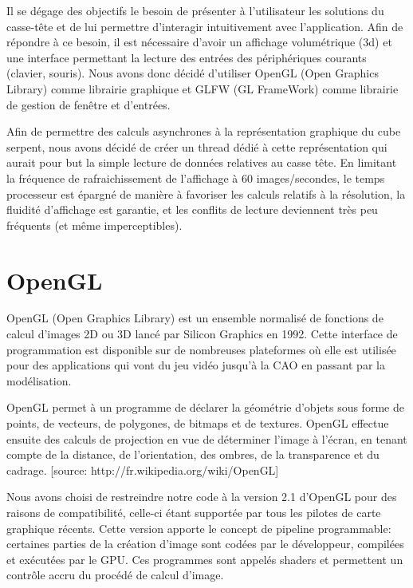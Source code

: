 Il se dégage des objectifs le besoin de présenter à l'utilisateur les solutions du casse-tête et de lui permettre d'interagir intuitivement avec l'application. Afin de répondre à ce besoin, il est nécessaire d'avoir un affichage volumétrique (3d) et une interface permettant la lecture des entrées des périphériques courants (clavier, souris). Nous avons donc décidé d'utiliser OpenGL (Open Graphics Library) comme librairie graphique et GLFW (GL FrameWork) comme librairie de gestion de fenêtre et d'entrées.

Afin de permettre des calculs asynchrones à la représentation graphique du cube serpent, nous avons décidé de créer un thread dédié à cette représentation qui aurait pour but la simple lecture de données relatives au casse tête. En limitant la fréquence de rafraichissement de l'affichage à 60 images/secondes, le temps processeur est épargné de manière à favoriser les calculs relatifs à la résolution,  la fluidité d'affichage est garantie, et les conflits de lecture deviennent très peu fréquents (et même imperceptibles).

\section{OpenGL}

OpenGL (Open Graphics Library) est un ensemble normalisé de fonctions de calcul d'images 2D ou 3D lancé par Silicon Graphics en 1992. Cette interface de programmation est disponible sur de nombreuses plateformes où elle est utilisée pour des applications qui vont du jeu vidéo jusqu'à la CAO en passant par la modélisation.

OpenGL permet à un programme de déclarer la géométrie d'objets sous forme de points, de vecteurs, de polygones, de bitmaps et de textures. OpenGL effectue ensuite des calculs de projection en vue de déterminer l'image à l'écran, en tenant compte de la distance, de l'orientation, des ombres, de la transparence et du cadrage. [source: http://fr.wikipedia.org/wiki/OpenGL]

Nous avons choisi de restreindre notre code à la version 2.1 d'OpenGL pour des raisons de compatibilité, celle-ci étant supportée par tous les pilotes de carte graphique récents. Cette version apporte le concept de pipeline programmable: certaines parties de la création d'image sont codées par le développeur, compilées et exécutées par le GPU. Ces programmes sont appelés shaders et permettent un contrôle accru du procédé de calcul d'image.

